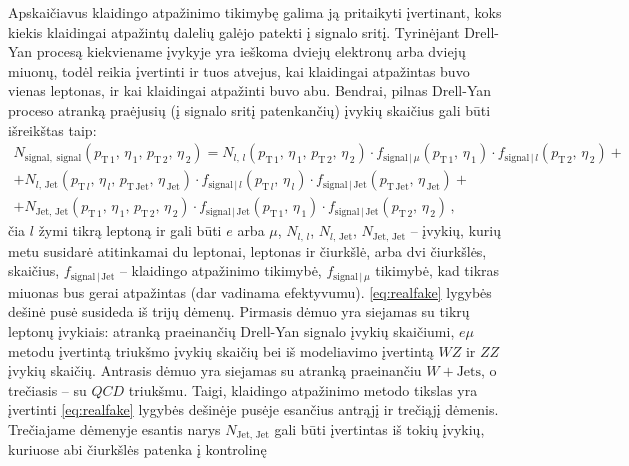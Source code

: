 \documentclass[a4paper, 12pt, oneside]{article}
\newcommand{\emu}{e\mu}
\newcommand{\WJets}{W\! +\!\mathrm{Jets}}
\newcommand{\QCD}{QC\! D}
\newlength\q
\begin{document}
Apskaičiavus klaidingo atpažinimo tikimybę galima ją pritaikyti įvertinant, koks kiekis klaidingai atpažintų dalelių galėjo patekti į signalo
sritį.
Tyrinėjant Drell-Yan procesą kiekviename įvykyje yra ieškoma dviejų elektronų arba dviejų miuonų, todėl reikia įvertinti ir tuos atvejus, kai
klaidingai atpažintas buvo vienas leptonas, ir kai klaidingai atpažinti buvo abu.
Bendrai, pilnas Drell-Yan proceso atranką praėjusių (į signalo sritį patenkančių) įvykių skaičius gali būti išreikštas taip:
\begin{multline}
	\label{eq:realfake}
	N_{\mathrm{signal, \; signal}}(p_{\mathrm{T}\, 1}, \, \eta_{\, 1}, \, p_{\mathrm{T}\, 2}, \, \eta_{\, 2}) =
	N_{l, \, l}(p_{\mathrm{T}\, 1}, \, \eta_{\, 1}, \, p_{\mathrm{T}\, 2}, \, \eta_{\, 2}) \cdot 
	f_{\mathrm{signal} \,| \,\mu}(p_{\mathrm{T}\, 1}, \, \eta_{\, 1}) \cdot f_{\mathrm{signal} \,| \, l}(p_{\mathrm{T}\, 2}, \, \eta_{\, 2}) + \\[5pt] +
	N_{l, \, \mathrm{Jet}}(p_{\mathrm{T}\, l}, \, \eta_{\, l}, \, p_{\mathrm{T}\, \mathrm{Jet}}, \, \eta_{\, \mathrm{Jet}}) \cdot 
	f_{\mathrm{signal} \,| \, l}(p_{\mathrm{T}\, l}, \, \eta_{\, l}) \cdot
	f_{\mathrm{signal} \,| \,\mathrm{Jet}}(p_{\mathrm{T \, Jet}}, \, \eta_{\,\mathrm{Jet}}) + \\[5pt] +
	N_{\mathrm{Jet, \, Jet}}(p_{\mathrm{T}\, 1}, \, \eta_{\, 1}, \, p_{\mathrm{T}\, 2}, \, \eta_{\, 2}) \cdot 
	f_{\mathrm{signal} \,| \,\mathrm{Jet}}(p_{\mathrm{T}\, 1}, \, \eta_{\, 1}) \cdot
	f_{\mathrm{signal} \,| \,\mathrm{Jet}}(p_{\mathrm{T}\, 2}, \, \eta_{\, 2})\, ,
\end{multline}
čia $l$ žymi tikrą leptoną ir gali būti $e$ arba $\mu$, $N_{l, \, l}$, $N_{l, \, \mathrm{Jet}}$, $N_{\mathrm{Jet, \, Jet}}$ -- įvykių,
kurių metu susidarė atitinkamai du leptonai, leptonas ir čiurkšlė, arba dvi čiurkšlės, skaičius, $f_{\mathrm{signal} \,| \,\mathrm{Jet}}$ -- klaidingo
atpažinimo tikimybė, $f_{\mathrm{signal} \,| \,\mu}$ tikimybė, kad tikras miuonas bus gerai atpažintas (dar vadinama efektyvumu).
\eqref{eq:realfake} lygybės dešinė pusė susideda iš trijų dėmenų.
Pirmasis dėmuo yra siejamas su tikrų leptonų įvykiais: atranką praeinančių Drell-Yan signalo įvykių skaičiumi, $\emu$ metodu įvertintą
triukšmo įvykių skaičių bei iš modeliavimo įvertintą $WZ$ ir $ZZ$ įvykių skaičių.
Antrasis dėmuo yra siejamas su atranką praeinančiu $\WJets$, o trečiasis -- su $\QCD$ triukšmu.
Taigi, klaidingo atpažinimo metodo tikslas yra įvertinti \eqref{eq:realfake} lygybės dešinėje pusėje esančius antrąjį ir trečiąjį dėmenis.
Trečiajame dėmenyje esantis narys $N_{\mathrm{Jet, \, Jet}}$ gali būti įvertintas iš tokių įvykių, kuriuose abi čiurkšlės patenka į kontrolinę
\end{document}
